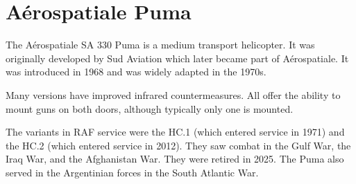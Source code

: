 \section{Aérospatiale Puma}

The Aérospatiale SA 330 Puma is a medium transport helicopter. It was originally developed by Sud Aviation which later became part of Aérospatiale. It was introduced in 1968 and was widely adapted in the 1970s.

Many versions have improved infrared countermeasures. All offer the ability to mount guns on both doors, although typically only one is mounted.

The variants in RAF service were the HC.1 (which entered service in 1971) and the HC.2 (which entered service in 2012). They saw combat in the Gulf War, the Iraq War, and the Afghanistan War. They were retired in 2025. The Puma also served in the Argentinian forces in the South Atlantic War.
